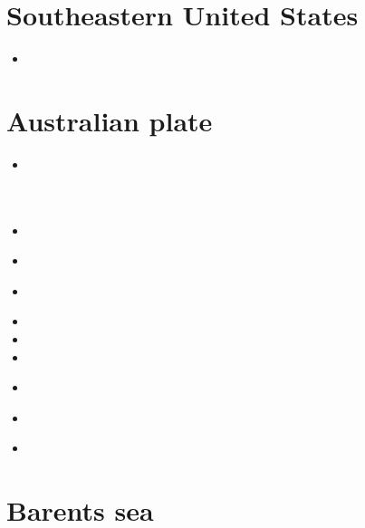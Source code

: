 \section{Southeastern United States}

\begin{small}
\begin{itemize}
\item[\twothousandnineteen] 
\end{itemize}
\end{small}

\section{Australian plate}

\begin{small}
\begin{itemize}
\item[\twothousandthree]
 \\
 \\
 \\
\item[\twothousandfive]
\item[\twothousandten]
 \\
\item[\twothousandeleven]
 \\
\item[\twothousandfourteen]
\item[\twothousandfifteen]
\item[\twothousandsixteen]
\item[\twothousandnineteen]
 \\
\item[\twothousandtwentytwo]
\\ 
\item[\twothousandtwentythree]
\end{itemize}
\end{small}

\section{Barents sea}

